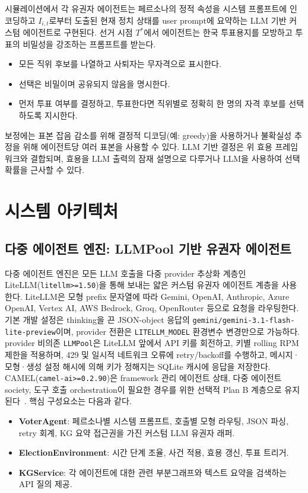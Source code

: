 \documentclass[11pt]{article}
\begin{document}
시뮬레이션에서 각 유권자 에이전트는 페르소나의 정적 속성을 시스템 프롬프트에 인코딩하고 $I_{i,t}$로부터 도출된 현재 정치 상태를 user prompt에 요약하는 LLM 기반 커스텀 에이전트로 구현된다. 선거 시점 $T^*$에서 에이전트는 한국 투표용지를 모방하고 투표의 비밀성을 강조하는 프롬프트를 받는다.

\begin{itemize}
  \item 모든 직위 후보를 나열하고 사퇴자는 무자격으로 표시한다.
  \item 선택은 비밀이며 공유되지 않음을 명시한다.
  \item 먼저 투표 여부를 결정하고, 투표한다면 직위별로 정확히 한 명의 자격 후보를 선택하도록 지시한다.
\end{itemize}

보정에는 표본 잡음 감소를 위해 결정적 디코딩(예: greedy)을 사용하거나 불확실성 추정을 위해 에이전트당 여러 표본을 사용할 수 있다. LLM 기반 결정은 위 효용 프레임워크와 결합되며, 효용을 LLM 출력의 잠재 설명으로 다루거나 LLM을 사용하여 선택 확률을 근사할 수 있다.

\section{시스템 아키텍처}

\subsection{다중 에이전트 엔진: LLMPool 기반 유권자 에이전트}

다중 에이전트 엔진은 모든 LLM 호출을 다중 provider 추상화 계층인 LiteLLM(\texttt{litellm>=1.50})을 통해 보내는 얇은 커스텀 유권자 에이전트 계층을 사용한다. LiteLLM은 모형 prefix 문자열에 따라 Gemini, OpenAI, Anthropic, Azure OpenAI, Vertex AI, AWS Bedrock, Groq, OpenRouter 등으로 요청을 라우팅한다. 기본 개발 설정은 thinking을 끈 JSON-object 응답의 \texttt{gemini/gemini-3.1-flash-lite-preview}이며, provider 전환은 \texttt{LITELLM\_MODEL} 환경변수 변경만으로 가능하다. provider 비의존 \texttt{LLMPool}은 LiteLLM 앞에서 API 키를 회전하고, 키별 rolling RPM 제한을 적용하며, 429 및 일시적 네트워크 오류에 retry/backoff를 수행하고, 메시지·모형·생성 설정 해시에 의해 키가 정해지는 SQLite 캐시에 응답을 저장한다. CAMEL(\texttt{camel-ai>=0.2.90})은 framework 관리 에이전트 상태, 다중 에이전트 society, 도구 호출 orchestration이 필요한 경우를 위한 선택적 Plan B 계층으로 유지된다~\cite{li2023camel}. 핵심 구성요소는 다음과 같다.

\begin{itemize}
  \item \textbf{VoterAgent}: 페르소나별 시스템 프롬프트, 호출별 모형 라우팅, JSON 파싱, retry 회계, KG 요약 접근권을 가진 커스텀 LLM 유권자 래퍼.
  \item \textbf{ElectionEnvironment}: 시간 단계 조율, 사건 적용, 효용 갱신, 투표 트리거.
  \item \textbf{KGService}: 각 에이전트에 대한 관련 부분그래프와 텍스트 요약을 검색하는 API 질의 제공.
\end{itemize}
\end{document}
